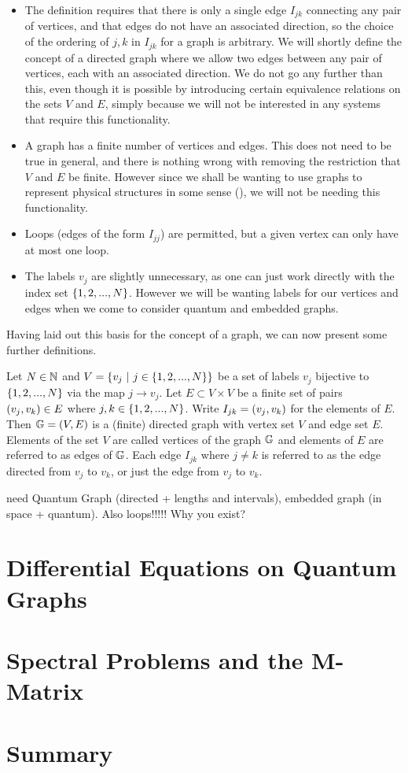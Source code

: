 \begin{itemize}
	\item The definition requires that there is only a single edge $I_{jk}$ connecting any pair of vertices, and that edges do not have an associated direction, so the choice of the ordering of $j,k$ in $I_{jk}$ for a graph is arbitrary.
	We will shortly define the concept of a directed graph where we allow two edges between any pair of vertices, each with an associated direction.
	We do not go any further than this, even though it is possible by introducing certain equivalence relations on the sets $V$ and $E$, simply because we will not be interested in any systems that require this functionality. 
	\item A graph has a finite number of vertices and edges.
	This does not need to be true in general, and there is nothing wrong with removing the restriction that $V$ and $E$ be finite.
	However since we shall be wanting to use graphs to represent physical structures in some sense (), we will not be needing this functionality.
	\item Loops (edges of the form $I_{jj}$) are permitted, but a given vertex can only have at most one loop.
	\item The labels $v_j$ are slightly unnecessary, as one can just work directly with the index set $\left\{ 1,2,...,N \right\}$.
	However we will be wanting labels for our vertices and edges when we come to consider quantum and embedded graphs.
\end{itemize}

Having laid out this basis for the concept of a graph, we can now present some further definitions.
\begin{definition} \label{def:DirectedGraph}
	Let $N\in\mathbb{N}$ and $V=\clbracs{v_j \ \vert \ j\in\clbracs{1,2,...,N}}$ be a set of labels $v_j$ bijective to $\left\{ 1,2,...,N \right\}$ via the map $j\rightarrow v_j$.
	Let $E\subset V\times V$ be a finite set of pairs $\left( v_j,v_k \right)\in E$ where $j,k\in\left\{ 1,2,...,N \right\}$.
	Write $I_{jk} = \left( v_j,v_k \right)$ for the elements of $E$.
	Then $\mathbb{G}=\left( V,E \right)$ is a (finite) directed graph with vertex set $V$ and edge set $E$.
	Elements of the set $V$ are called vertices of the graph $\mathbb{G}$ and elements of $E$ are referred to as edges of $\mathbb{G}$.
	Each edge $I_{jk}$ where $j\neq k$ is referred to as the edge directed from $v_j$ to $v_k$, or just the edge from $v_j$ to $v_k$.
\end{definition}

need Quantum Graph (directed + lengths and intervals), embedded graph (in space + quantum).
Also loops!!!!! Why you exist?

\section{Differential Equations on Quantum Graphs}

\section{Spectral Problems and the M-Matrix}

\section{Summary}